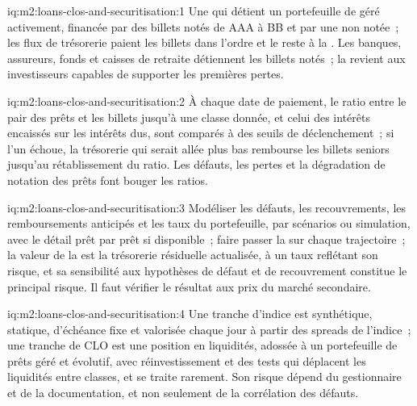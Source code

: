 \begin{solution}{iq:m2:loans-clos-and-securitisation:1}
Une  qui détient un portefeuille de  géré activement, financée par des billets notés
de AAA à BB et par une  non notée~; les flux de trésorerie paient les billets dans l'ordre et le
reste à la . Les banques, assureurs, fonds et caisses de retraite détiennent les billets notés~; la
 revient aux investisseurs capables de supporter les premières pertes.
\end{solution}

\begin{solution}{iq:m2:loans-clos-and-securitisation:2}
À chaque date de paiement, le ratio entre le pair des prêts et les billets jusqu'à une classe donnée, et celui
des intérêts encaissés sur les intérêts dus, sont comparés à des seuils de déclenchement~; si l'un échoue, la
trésorerie qui serait allée plus bas rembourse les billets seniors jusqu'au rétablissement du ratio.
Les défauts, les pertes et la dégradation de notation des prêts font bouger les ratios.
\end{solution}

\begin{solution}{iq:m2:loans-clos-and-securitisation:3}
Modéliser les défauts, les recouvrements, les remboursements anticipés et les taux du portefeuille, par scénarios ou
simulation, avec le détail prêt par prêt si disponible~; faire passer la  sur chaque trajectoire~; la
valeur de la  est la trésorerie résiduelle actualisée, à un taux reflétant son risque, et
sa sensibilité aux hypothèses de défaut et de recouvrement constitue le principal risque. Il faut vérifier le
résultat aux prix du marché secondaire.
\end{solution}

\begin{solution}{iq:m2:loans-clos-and-securitisation:4}
Une tranche d'indice est synthétique, statique, d'échéance fixe et valorisée chaque jour à partir des
spreads de l'indice~; une tranche de CLO est une position en liquidités, adossée à un portefeuille de prêts géré et évolutif, avec
réinvestissement et des tests qui déplacent les liquidités entre classes, et se traite rarement. Son risque
dépend du gestionnaire et de la documentation, et non seulement de la corrélation des défauts.
\end{solution}

